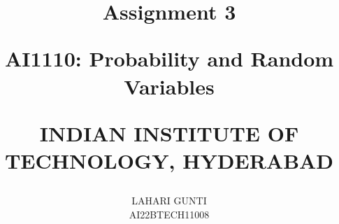 \documentclass[journal,12pt,onecolumn]{IEEEtran}
\begin{document}
 \let\vec\mathbf 
  
  
  
  
 \vspace{3cm} 
  
 \title{ Assignment 3 
  
         \Large AI1110: Probability and Random Variables 
  
          INDIAN INSTITUTE OF TECHNOLOGY, HYDERABAD 
 } 
 \author{ LAHARI GUNTI 
          
         AI22BTECH11008 
 } 
  
 \maketitle 
  
\end{document}
